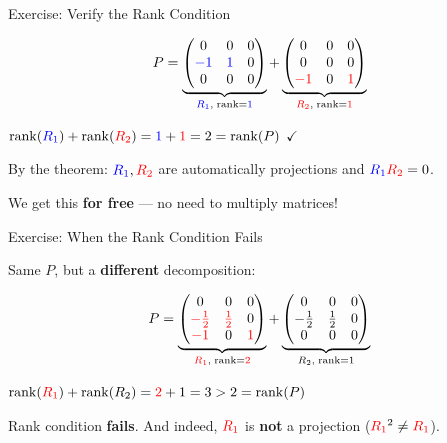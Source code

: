 \documentclass[10pt]{beamer}
\theoremstyle{definition}
\newcommand{\x}[1]{\alert{\textbf{#1}}}
\newcommand{\rd}[1]{{\color{red}#1}}                  %
\newcommand{\bl}[1]{{\color{blue}#1}}                 %
\begin{document}
\begin{frame}{Exercise: Verify the Rank Condition}

$$P = \underbrace{\begin{pmatrix} 0 & 0 & 0 \\ \bl{-1} & \bl{1} & 0 \\ 0 & 0 & 0 \end{pmatrix}}_{\bl{R_1},\; \operatorname{rank} = \bl{1}} + \underbrace{\begin{pmatrix} 0 & 0 & 0 \\ 0 & 0 & 0 \\ \rd{-1} & 0 & \rd{1} \end{pmatrix}}_{\rd{R_2},\; \operatorname{rank} = \rd{1}}$$

\vspace{0.3em}

$\operatorname{rank}(\bl{R_1}) + \operatorname{rank}(\rd{R_2}) = \bl{1} + \rd{1} = 2 = \operatorname{rank}(P)$ $\checkmark$

\vspace{0.5em}

By the theorem: $\bl{R_1}, \rd{R_2}$ are automatically projections and $\bl{R_1}\rd{R_2} = 0$.

We get this \x{for free} --- no need to multiply matrices!

\end{frame}


\begin{frame}{Exercise: When the Rank Condition Fails}

Same $P$, but a \x{different} decomposition:

$$P = \underbrace{\begin{pmatrix} 0 & 0 & 0 \\ \rd{-\frac{1}{2}} & \rd{\frac{1}{2}} & 0 \\ \rd{-1} & 0 & \rd{1} \end{pmatrix}}_{\rd{R_1},\; \operatorname{rank} = \rd{2}} + \underbrace{\begin{pmatrix} 0 & 0 & 0 \\ -\frac{1}{2} & \frac{1}{2} & 0 \\ 0 & 0 & 0 \end{pmatrix}}_{R_2,\; \operatorname{rank} = 1}$$

\vspace{0.3em}

$\operatorname{rank}(\rd{R_1}) + \operatorname{rank}(R_2) = \rd{2} + 1 = 3 > 2 = \operatorname{rank}(P)$

\vspace{0.5em}

Rank condition \x{fails}. And indeed, $\rd{R_1}$ is \x{not} a projection ($\rd{R_1}^2 \neq \rd{R_1}$).

\end{frame}
\end{document}
